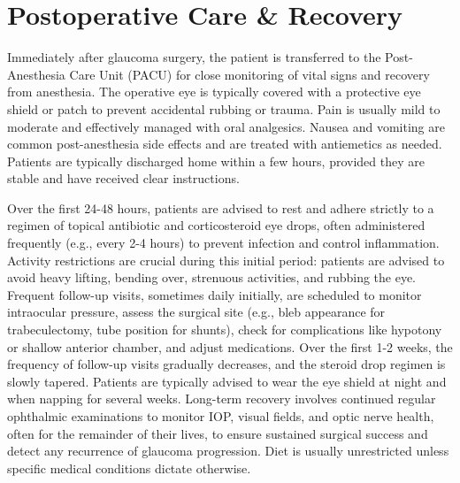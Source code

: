 \section*{Postoperative Care \& Recovery}
Immediately after glaucoma surgery, the patient is transferred to the Post-Anesthesia Care Unit (PACU) for close monitoring of vital signs and recovery from anesthesia. The operative eye is typically covered with a protective eye shield or patch to prevent accidental rubbing or trauma. Pain is usually mild to moderate and effectively managed with oral analgesics. Nausea and vomiting are common post-anesthesia side effects and are treated with antiemetics as needed. Patients are typically discharged home within a few hours, provided they are stable and have received clear instructions.

Over the first 24-48 hours, patients are advised to rest and adhere strictly to a regimen of topical antibiotic and corticosteroid eye drops, often administered frequently (e.g., every 2-4 hours) to prevent infection and control inflammation. Activity restrictions are crucial during this initial period: patients are advised to avoid heavy lifting, bending over, strenuous activities, and rubbing the eye. Frequent follow-up visits, sometimes daily initially, are scheduled to monitor intraocular pressure, assess the surgical site (e.g., bleb appearance for trabeculectomy, tube position for shunts), check for complications like hypotony or shallow anterior chamber, and adjust medications. Over the first 1-2 weeks, the frequency of follow-up visits gradually decreases, and the steroid drop regimen is slowly tapered. Patients are typically advised to wear the eye shield at night and when napping for several weeks. Long-term recovery involves continued regular ophthalmic examinations to monitor IOP, visual fields, and optic nerve health, often for the remainder of their lives, to ensure sustained surgical success and detect any recurrence of glaucoma progression. Diet is usually unrestricted unless specific medical conditions dictate otherwise.

